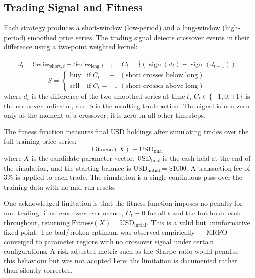 \label{sec:bot_design}

\subsection{Trading Signal and Fitness}

Each strategy produces a short-window (low-period) and a long-window
(high-period) smoothed price series. The trading signal detects crossover
events in their difference using a two-point weighted kernel:

\begin{eqnarray}
  \label{signal}
  d_t = \mathrm{Series}_{\text{short},t} - \mathrm{Series}_{\text{long},t}
  \quad\text{, }\quad
  C_t = \tfrac{1}{2}\!\left(\operatorname{sign}(d_t) -
  \operatorname{sign}(d_{t-1})\right)
\end{eqnarray}
\begin{equation}
  S =
  \left\{
  \begin{array}{ll}
    \text{buy}  & \text{if } C_t = -1 \;(\text{short crosses below long}) \\
    \text{sell} & \text{if } C_t = +1 \;(\text{short crosses above long})
  \end{array}
  \right.
\end{equation}
where $d_t$ is the difference of the two smoothed series at time $t$, $C_t
\in \{-1, 0, +1\}$ is the crossover indicator, and $S$ is the resulting
trade action. The signal is non-zero only at the moment of a crossover; it
is zero on all other timesteps.

The fitness function measures final USD holdings after simulating trades
over the full training price series:
\begin{equation} \label{eqn:fitness}
  \mathrm{Fitness}(X) = \mathrm{USD}_{\text{final}}
\end{equation}
where $X$ is the candidate parameter vector, $\mathrm{USD}_{\text{final}}$
is the cash held at the end of the simulation, and the starting balance is
$\mathrm{USD}_{\text{initial}} = \$1000$. A transaction fee of 3\% is
applied to each trade. The simulation is a single continuous pass over the
training data with no mid-run resets.

One acknowledged limitation is that the fitness function imposes no penalty
for non-trading: if no crossover ever occurs, $C_t = 0$ for all $t$ and the
bot holds cash throughout, returning $\mathrm{Fitness}(X) =
\mathrm{USD}_{\text{initial}}$. This is a valid but uninformative fixed
point. The bad/broken optimum was observed empirically --- MRFO converged
to parameter regions with no crossover signal under certain configurations.
A risk-adjusted metric such as the Sharpe ratio would penalise this
behaviour but was not adopted here; the limitation is documented rather
than silently corrected.

